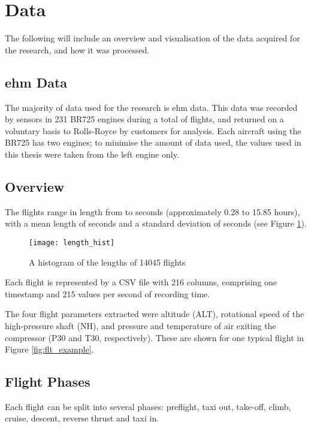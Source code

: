 \section{Data}
The following will include an overview and visualisation of the data acquired for the research, and how it was processed.

\subsection{\ac{ehm} Data}
The majority of data used for the research is \ac{ehm} data. This data was recorded by sensors in 231 BR725 engines during a total of  flights, and returned on a voluntary basis to Rolls-Royce by customers for analysis. Each aircraft using the BR725 has two engines; to minimise the amount of data used, the values used in this thesis were taken from the left engine only.

\subsection{Overview}
The flights range in length from  to  seconds (approximately 0.28 to 15.85 hours), with a mean length of  seconds and a standard deviation of  seconds (see Figure \ref{fig:flt_len}).

\begin{figure}
    \centering
    \texttt{[image: length\_hist]}
    \caption{\label{fig:flt_len} A histogram of the lengths of 14045 flights}
\end{figure}

Each flight is represented by a CSV file with 216 columns, comprising one timestamp and 215 values per second of recording time.

The four flight parameters extracted were altitude (ALT), rotational speed of the high-pressure shaft (NH), and pressure and temperature of air exiting the compressor (P30 and T30, respectively). These are shown for one typical flight in Figure \ref{fig:flt_example}.



\subsection{Flight Phases}
Each flight can be split into several phases: preflight, taxi out, take-off, climb, cruise, descent, reverse thrust and taxi in.


